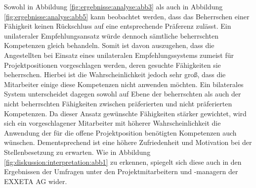 Sowohl in Abbildung \ref{fig:ergebnisse:analyse:abb3} als auch in Abbildung \ref{fig:ergebnisse:analyse:abb5} kann beobachtet werden, dass das Beherrschen einer Fähigkeit keinen Rückschluss auf eine entsprechende Präferenz zulässt. Ein unilateraler Empfehlungsansatz würde dennoch sämtliche beherrschten Kompetenzen gleich behandeln. Somit ist davon auszugehen, dass die Angestellten bei Einsatz eines unilateralen Empfehlungssystems zumeist für Projektpositionen vorgeschlagen werden, deren gesuchte Fähigkeiten sie beherrschen. Hierbei ist die Wahrscheinlichkeit jedoch sehr groß, dass die Mitarbeiter einige diese Kompetenzen nicht anwenden möchten. Ein bilaterales System unterscheidet dagegen sowohl auf Ebene der beherrschten als auch der nicht beherrschten Fähigkeiten zwischen präferierten und nicht präferierten Kompetenzen. Da dieser Ansatz gewünschte Fähigkeiten stärker gewichtet, wird sich ein vorgeschlagener Mitarbeiter mit höherer Wahrscheinlichkeit die Anwendung der für die offene Projektposition benötigten Kompetenzen auch wünschen. Dementsprechend ist eine höhere Zufriedenheit und Motivation bei der Stellenbesetzung zu erwarten. Wie in Abbildung \ref{fig:diskussion:interpretation:abb1} zu erkennen, spiegelt sich diese auch in den Ergebnissen der Umfragen unter den Projektmitarbeitern und -managern der EXXETA AG wider.

